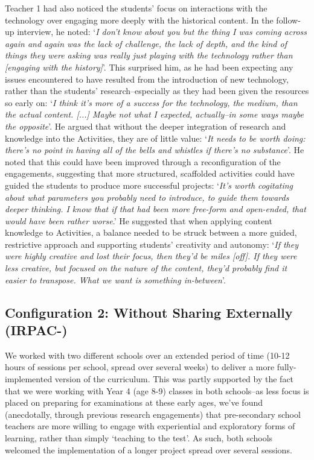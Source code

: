 \documentclass[,hyphens]{sigchi}
\begin{document}
Teacher 1 had also noticed the students' focus on interactions with the technology over engaging more deeply with the historical content. In the follow-up interview, he noted: `\textit{I don't know about you but the thing I was coming across again and again was the lack of challenge, the lack of depth, and the kind of things they were asking was really just playing with the technology rather than [engaging with the history]}'. This surprised him, as he had been expecting any issues encountered to have resulted from the introduction of new technology, rather than the students' research--especially as they had been given the resources so early on: `\textit{I think it's more of a success for the technology, the medium, than the actual content. [...] Maybe not what I expected, actually--in some ways maybe the opposite}'. He argued that without the deeper integration of research and knowledge into the Activities, they are of little value: `\textit{It needs to be worth doing: there's no point in having all of the bells and whistles if there's no substance}'. He noted that this could have been improved through a reconfiguration of the engagements, suggesting that more structured, scaffolded activities could have guided the students to produce more successful projects: `\textit{It's worth cogitating about what parameters you probably need to introduce, to guide them towards deeper thinking. I know that if that had been more free-form and open-ended, that would have been rather worse}.' He suggested that when applying content knowledge to Activities, a balance needed to be struck between a more guided, restrictive approach and supporting students' creativity and autonomy: `\textit{If they were highly creative and lost their focus, then they'd be miles [off]. If they were less creative, but focused on the nature of the content, they'd probably find it easier to transpose. What we want is something in-between}'.

\subsection{Configuration 2: Without Sharing Externally (IRPAC-)}
We worked with two different schools over an extended period of time (10-12 hours of sessions per school, spread over several weeks) to deliver a more fully-implemented version of the curriculum. This was partly supported by the fact that we were working with Year 4 (age 8-9) classes in both schools--as less focus is placed on preparing for examinations at these early ages, we've found (anecdotally, through previous research engagements) that pre-secondary school teachers are more willing to engage with experiential and exploratory forms of learning, rather than simply `teaching to the test'. As such, both schools welcomed the implementation of a longer project spread over several sessions.
\end{document}
